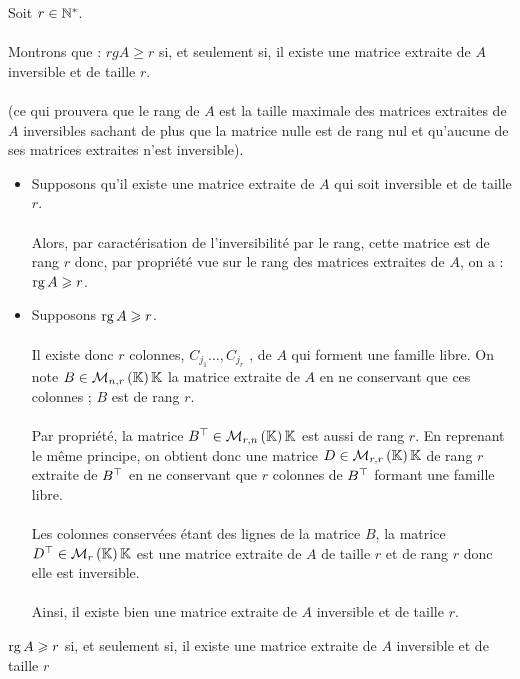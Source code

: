 \begin{dem}
    Soit \(r \in \mathbb{N}^*\).\\~\\
    Montrons que : \(rg A \geq r\) si, et seulement si, il existe une matrice extraite de \(A\) inversible et de taille \(r\).\\~\\
    (ce qui prouvera que le rang de \(A\) est la taille maximale des matrices extraites de \(A\) inversibles sachant de plus que la matrice nulle est de rang nul et qu’aucune de ses matrices extraites n’est inversible).
    \begin{itemize}
        \item Supposons qu’il existe une matrice extraite de \(A\) qui soit inversible et de taille \(r\).\\~\\
        Alors, par caractérisation de l’inversibilité par le rang, cette matrice est de rang \(r\) donc, par propriété vue sur le rang des matrices extraites de \(A\), on a : \( \operatorname{rg} A \geqslant r\).
        \item Supposons \(\operatorname{rg} A \geqslant r\).\\~\\
        Il existe donc \(r\) colonnes, \(C_{j_1} \dots , C_{j_r}\) , de \(A\) qui forment une famille libre. On note \(B \in \M{n,r}{\K}\) la matrice extraite de \(A\) en ne conservant que ces colonnes ; \(B\) est de rang \(r\).\\~\\
        Par propriété, la matrice \(\trans{B} \in \M{r,n}{\K}\) est aussi de rang \(r\). En reprenant le même principe, on obtient donc une matrice \(D \in \M{r,r}{\K}\) de rang \(r\) extraite de \(B^{\top}\) en ne conservant que \(r\) colonnes de \(B^{\top}\) formant une famille libre.\\~\\
        Les colonnes conservées étant des lignes de la matrice \(B\), la matrice \(\trans{D} \in \M{r}{\K}\) est une matrice extraite de \(A\) de taille \(r\) et de rang \(r\) donc elle est inversible.\\~\\
        Ainsi, il existe bien une matrice extraite de \(A\) inversible et de taille \(r\).
    \end{itemize}
    \(\operatorname{rg} A \geqslant r\) si, et seulement si, il existe une matrice extraite de \(A\) inversible et de taille \(r\)
\end{dem}